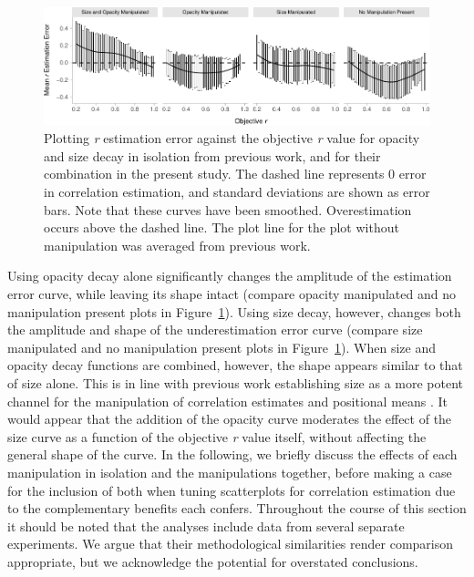 \documentclass[manuscript, review, anonymous, screen]{acmart}
\begin{document}
\begin{figure}

{\centering \includegraphics[width=1\textwidth,height=\textheight]{size_and_opacity_files/figure-pdf/fig-est-multi-exp-1.pdf}

}

\caption{\label{fig-est-multi-exp}Plotting \emph{r} estimation error
against the objective \emph{r} value for opacity and size decay in
isolation from previous work, and for their combination in the present
study. The dashed line represents 0 error in correlation estimation, and
standard deviations are shown as error bars. Note that these curves have
been smoothed. Overestimation occurs above the dashed line. The plot
line for the plot without manipulation was averaged from previous work.}

\end{figure}

Using opacity decay alone significantly changes the amplitude of the
estimation error curve, while leaving its shape intact (compare opacity
manipulated and no manipulation present plots in
Figure~\ref{fig-est-multi-exp}). Using size decay, however, changes both
the amplitude and shape of the underestimation error curve (compare size
manipulated and no manipulation present plots in
Figure~\ref{fig-est-multi-exp}). When size and opacity decay functions
are combined, however, the shape appears similar to that of size alone.
This is in line with previous work establishing size as a more potent
channel for the manipulation of correlation estimates
\citep{strain_2023b} and positional means \citep{hong_2021}. It would
appear that the addition of the opacity curve moderates the effect of
the size curve as a function of the objective \emph{r} value itself,
without affecting the general shape of the curve. In the following, we
briefly discuss the effects of each manipulation in isolation and the
manipulations together, before making a case for the inclusion of both
when tuning scatterplots for correlation estimation due to the
complementary benefits each confers. Throughout the course of this
section it should be noted that the analyses include data from several
separate experiments. We argue that their methodological similarities
render comparison appropriate, but we acknowledge the potential for
overstated conclusions.
\end{document}
